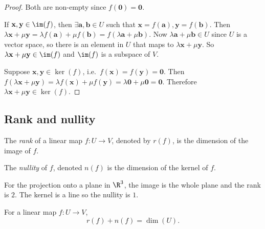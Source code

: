 \documentclass[a4paper]{article}
\begin{document}
\begin{proof}
  Both are non-empty since $f(\mathbf{0}) = \mathbf{0}$.

  If $\mathbf{x, y}\in \im (f)$, then $\exists \mathbf{a, b}\in U$ such that $\mathbf{x} = f(\mathbf{a}), \mathbf{y} = f(\mathbf{b})$. Then $\lambda \mathbf{x} + \mu\mathbf {y} = \lambda f(\mathbf{a}) + \mu f(\mathbf{b}) = f(\lambda\mathbf{a} + \mu\mathbf{b})$. Now $\lambda\mathbf{a} + \mu\mathbf{b}\in U$ since $U$ is a vector space, so there is an element in $U$ that maps to $\lambda\mathbf{x}+ \mu\mathbf{y}$. So $\lambda\mathbf{x}+ \mu\mathbf{y}\in \im (f)$ and $\im (f)$ is a subspace of $V$.

  Suppose $\mathbf{x, y}\in \ker(f)$, i.e.\ $f(\mathbf{x}) = f(\mathbf {y}) = \mathbf{0}$. Then $f(\lambda\mathbf{x} + \mu\mathbf{y}) = \lambda f(\mathbf{x}) + \mu f(\mathbf{y}) = \lambda \mathbf{0} + \mu\mathbf{0} = \mathbf{0}$. Therefore $\lambda\mathbf{x}+ \mu\mathbf{y} \in \ker (f)$.
\end{proof}

\subsection{Rank and nullity}
\begin{defi}
  The \emph{rank} of a linear map $f: U\to V$, denoted by $r(f)$, is the dimension of the image of $f$.
\end{defi}

\begin{defi}
  The \emph{nullity} of $f$, denoted $n(f)$ is the dimension of the kernel of $f$.
\end{defi}

\begin{eg}
  For the projection onto a plane in $\R^3$, the image is the whole plane and the rank is $2$. The kernel is a line so the nullity is $1$.
\end{eg}

\begin{thm}
  For a linear map $f: U \to V$,
  \[
    r(f) + n(f) = \dim (U).
  \]
\end{thm}
\end{document}
